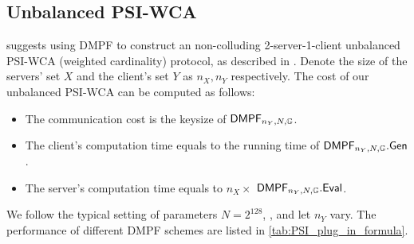 
\subsection{Unbalanced PSI-WCA}
\cite{cryptoeprint:2020/1599} suggests using DMPF to construct an non-colluding 2-server-1-client unbalanced PSI-WCA (weighted cardinality) protocol, as described in . Denote the size of the servers' set $X$ and the client's set $Y$ as $n_X, n_Y$ respectively. 
The cost of our unbalanced PSI-WCA can be computed as follows: 
\begin{itemize}
  \item The communication cost is the keysize of ${\sf DMPF}_{n_Y,N,\mathbb{G}}$. 
  \item The client's computation time equals to the running time of ${\sf DMPF}_{n_Y,N,\mathbb{G}}.{\sf Gen}$. 
  \item The server's computation time equals to $n_X\times$ ${\sf DMPF}_{n_Y,N,\mathbb{G}}.{\sf Eval}$. 
\end{itemize}

We follow the typical setting of parameters $N = 2^{128}$, , and let $n_Y$ vary. The performance of different DMPF schemes are listed in \cref{tab:PSI_plug_in_formula}. 


